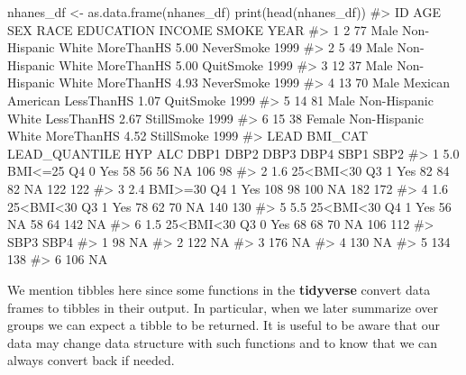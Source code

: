 \documentclass[
  letterpaper,
]{latex/krantz}
\makeatletter
\newenvironment{Shaded}{\begin{snugshade}}{\end{snugshade}}
\newcommand{\CommentTok}[1]{\textcolor[rgb]{0.37,0.37,0.37}{#1}}
\newcommand{\FunctionTok}[1]{\textcolor[rgb]{0.28,0.35,0.67}{#1}}
\newcommand{\NormalTok}[1]{\textcolor[rgb]{0.00,0.23,0.31}{#1}}
\newcommand{\OtherTok}[1]{\textcolor[rgb]{0.00,0.23,0.31}{#1}}
\newenvironment{kframe}{%
\medskip{}
\setlength{\fboxsep}{.8em}
 \def\at@end@of@kframe{}%
 \ifinner\ifhmode%
  \def\at@end@of@kframe{\end{minipage}}%
  \begin{minipage}{\columnwidth}%
 \fi\fi%
 \def\FrameCommand##1{\hskip\@totalleftmargin \hskip-\fboxsep
 \colorbox{shadecolor}{##1}\hskip-\fboxsep
     \hskip-\linewidth \hskip-\@totalleftmargin \hskip\columnwidth}%
 \MakeFramed {\advance\hsize-\width
   \@totalleftmargin\z@ \linewidth\hsize
   \@setminipage}}%
 {\par\unskip\endMakeFramed%
 \at@end@of@kframe}
\renewenvironment{Shaded}{\begin{kframe}}{\end{kframe}}
\makeatother
\begin{document}
\begin{Shaded}
\begin{Highlighting}[]
\NormalTok{nhanes\_df }\OtherTok{\textless{}{-}} \FunctionTok{as.data.frame}\NormalTok{(nhanes\_df)}
\FunctionTok{print}\NormalTok{(}\FunctionTok{head}\NormalTok{(nhanes\_df))}
\CommentTok{\#\textgreater{}   ID AGE    SEX               RACE  EDUCATION INCOME      SMOKE YEAR}
\CommentTok{\#\textgreater{} 1  2  77   Male Non{-}Hispanic White MoreThanHS   5.00 NeverSmoke 1999}
\CommentTok{\#\textgreater{} 2  5  49   Male Non{-}Hispanic White MoreThanHS   5.00  QuitSmoke 1999}
\CommentTok{\#\textgreater{} 3 12  37   Male Non{-}Hispanic White MoreThanHS   4.93 NeverSmoke 1999}
\CommentTok{\#\textgreater{} 4 13  70   Male   Mexican American LessThanHS   1.07  QuitSmoke 1999}
\CommentTok{\#\textgreater{} 5 14  81   Male Non{-}Hispanic White LessThanHS   2.67 StillSmoke 1999}
\CommentTok{\#\textgreater{} 6 15  38 Female Non{-}Hispanic White MoreThanHS   4.52 StillSmoke 1999}
\CommentTok{\#\textgreater{}   LEAD   BMI\_CAT LEAD\_QUANTILE HYP ALC DBP1 DBP2 DBP3 DBP4 SBP1 SBP2}
\CommentTok{\#\textgreater{} 1  5.0   BMI\textless{}=25            Q4   0 Yes   58   56   56   NA  106   98}
\CommentTok{\#\textgreater{} 2  1.6 25\textless{}BMI\textless{}30            Q3   1 Yes   82   84   82   NA  122  122}
\CommentTok{\#\textgreater{} 3  2.4   BMI\textgreater{}=30            Q4   1 Yes  108   98  100   NA  182  172}
\CommentTok{\#\textgreater{} 4  1.6 25\textless{}BMI\textless{}30            Q3   1 Yes   78   62   70   NA  140  130}
\CommentTok{\#\textgreater{} 5  5.5 25\textless{}BMI\textless{}30            Q4   1 Yes   56   NA   58   64  142   NA}
\CommentTok{\#\textgreater{} 6  1.5 25\textless{}BMI\textless{}30            Q3   0 Yes   68   68   70   NA  106  112}
\CommentTok{\#\textgreater{}   SBP3 SBP4}
\CommentTok{\#\textgreater{} 1   98   NA}
\CommentTok{\#\textgreater{} 2  122   NA}
\CommentTok{\#\textgreater{} 3  176   NA}
\CommentTok{\#\textgreater{} 4  130   NA}
\CommentTok{\#\textgreater{} 5  134  138}
\CommentTok{\#\textgreater{} 6  106   NA}
\end{Highlighting}
\end{Shaded}

We mention tibbles here since some functions in the \textbf{tidyverse}
convert data frames to tibbles in their output. In particular, when we
later summarize over groups we can expect a tibble to be returned. It is
useful to be aware that our data may change data structure with such
functions and to know that we can always convert back if needed.
\end{document}
